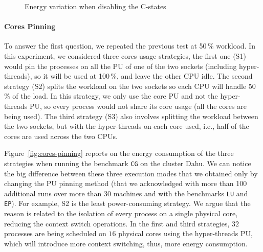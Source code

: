 \begin{figure}
    \caption{Energy variation when disabling the C-states}\label{fig:c-states}
\end{figure}

\paragraph{Cores Pinning}
To answer the first question, we repeated the previous test at 50\,\% workload.
In this experiment, we considered three cores usage strategies, the first one (\textsf{S1}) would pin the processes on all the PU of one of the two sockets (including hyper-threads), so it will be used at 100\,\%, and leave the other CPU idle.
The second strategy (\textsf{S2}) splits the workload on the two sockets so each CPU will handle 50\,\% of the load.
In this strategy, we only use the core PU and not the hyper-threads PU, so every process would not share its core usage (all the cores are being used).
The third strategy (\textsf{S3}) also involves splitting the workload between the two sockets, but with the hyper-threads on each core used, i.e., half of the cores are used across the two CPUs.

Figure~\ref{fig:cores-pinning} reports on the energy consumption of the three strategies when running the benchmark \texttt{CG} on the cluster \textsf{Dahu}.
We can notice the big difference between these three execution modes that we obtained only by changing the PU pinning method (that we acknowledged with more than 100 additional runs over more than 30 machines and with the benchmarks \texttt{LU} and \texttt{EP}).
For example, \textsf{S2} is the least power-consuming strategy.
We argue that the reason is related to the isolation of every process on a single physical core, reducing the context switch operations.
In the first and third strategies, $32$ processes are being scheduled on $16$ physical cores using the hyper-threads PU, which will introduce more context switching, thus, more energy consumption.

